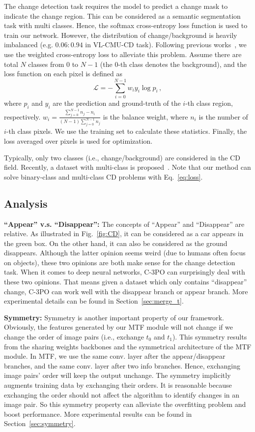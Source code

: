 \documentclass[review]{elsarticle}
\begin{document}
The change detection task requires the model to predict a change mask to indicate the change region. This can be considered as a semantic segmentation task with multi classes. Hence, the softmax cross-entropy loss function is used to train our network. However, the distribution of change/background is heavily imbalanced (e.g. $0.06:0.94$ in VL-CMU-CD task). Following previous works~\cite{HPCFNet}, we use the weighted cross-entropy loss to alleviate this problem. Assume there are total $N$ classes from $0$ to $N - 1$ (the $0$-th class denotes the background), and the loss function on each pixel is defined as
\begin{equation}
  \label{eq:loss}
  \mathcal{L} = - \sum_{i=0}^{N-1} w_i y_i \log p_i\,,
\end{equation}
where $p_i$ and $y_i$ are the prediction and ground-truth of the $i$-th class region, respectively. $w_i = \frac{\sum_{j=0}^{N-1} n_j - n_i}{(N-1) \sum_{j=0}^{N-1} n_j}$ is the balance weight, where $n_i$ is the number of $i$-th class pixels. We use the training set to calculate these statistics. Finally, the loss averaged over pixels is used for optimization. 

Typically, only two classes (i.e., change/background) are considered in the CD field. Recently, a dataset with multi-class is proposed~\cite{changesim}. Note that our method can solve binary-class and multi-class CD problems with Eq.~\ref{eq:loss}.

\subsection{Analysis}
\label{sec:analysis}

\textbf{``Appear'' v.s. ``Disappear'':} The concepts of ``Appear'' and ``Disappear'' are relative. As illustrated in Fig.~\ref{fig:CD}, it can be considered as a car appears in the green box. On the other hand, it can also be considered as the ground disappears. Although the latter opinion seems weird (due to humans often focus on objects), these two opinions are both make sense for the change detection task. When it comes to deep neural networks, C-3PO can surprisingly deal with these two opinions. That means given a dataset which only contains ``disappear'' change, C-3PO can work well with the disappear branch or appear branch. More experimental details can be found in Section~\ref{sec:merge_t}.

\textbf{Symmetry:} Symmetry is another important property of our framework. Obviously, the features generated by our MTF module will not change if we change the order of image pairs (i.e., exchange $t_0$ and $t_1$). This symmetry results from the sharing weights backbones and the symmetrical architecture of the MTF module. In MTF, we use the same conv. layer after the appear/disappear branches, and the same conv. layer after two info branches. Hence, exchanging image pairs' order will keep the output unchange. The symmetry implicitly augments training data by exchanging their orders. It is reasonable because exchanging the order should not affect the algorithm to identify changes in an image pair. So this symmetry property can alleviate the overfitting problem and boost performance. More experimental results can be found in Section~\ref{sec:symmetry}. 
\end{document}

